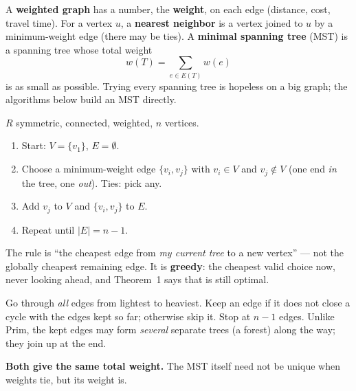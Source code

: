 \documentclass{fkt-notes}
\theoremstyle{definition}
\begin{document}
A \textbf{weighted graph} has a number, the \textbf{weight}, on each edge
(distance, cost, travel time). For a vertex $u$, a \textbf{nearest
  neighbor} is a vertex joined to $u$ by a minimum-weight edge (there may
be ties). A \textbf{minimal spanning tree} (MST) is a spanning tree whose
total weight
\[
  w(T)=\sum_{e\in E(T)} w(e)
\]
is as small as possible. Trying every spanning tree is hopeless on a big
graph; the algorithms below build an MST directly.

\begin{rulebox}[title={Prim's algorithm (7.5 Theorem 1: it always gives an MST)}]
  $R$ symmetric, connected, weighted, $n$ vertices.
  \begin{enumerate}[nosep]
    \item Start: $V=\{v_1\}$, $E=\emptyset$.
    \item Choose a minimum-weight edge $\{v_i,v_j\}$ with
          $v_i\in V$ and $v_j\notin V$ (one end \emph{in} the tree, one
          \emph{out}). Ties: pick any.
    \item Add $v_j$ to $V$ and $\{v_i,v_j\}$ to $E$.
    \item Repeat until $|E|=n-1$.
  \end{enumerate}
  The rule is ``the cheapest edge from \emph{my current tree} to a new
  vertex'' --- not the globally cheapest remaining edge. It is
  \textbf{greedy}: the cheapest valid choice now, never looking ahead,
  and Theorem~1 says that is still optimal.
\end{rulebox}

\begin{rulebox}[title={Kruskal's algorithm}]
  Go through \emph{all} edges from lightest to heaviest. Keep an edge if
  it does not close a cycle with the edges kept so far; otherwise skip
  it. Stop at $n-1$ edges. Unlike Prim, the kept edges may form
  \emph{several} separate trees (a forest) along the way; they join up
  at the end.
\end{rulebox}
\noindent\textbf{Both give the same total weight.} The MST itself need
not be unique when weights tie, but its weight is.
\end{document}
